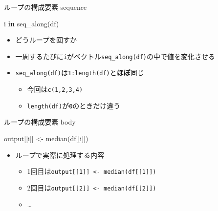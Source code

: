 \documentclass[
  ignorenonframetext,
  aspectratio=169]{beamer}
\newenvironment{Shaded}{\begin{snugshade}}{\end{snugshade}}
\newcommand{\ControlFlowTok}[1]{\textcolor[rgb]{0.13,0.29,0.53}{\textbf{#1}}}
\newcommand{\FunctionTok}[1]{\textcolor[rgb]{0.00,0.00,0.00}{#1}}
\newcommand{\NormalTok}[1]{#1}
\newcommand{\OtherTok}[1]{\textcolor[rgb]{0.56,0.35,0.01}{#1}}
\providecommand{\tightlist}{%
  \setlength{\itemsep}{0pt}\setlength{\parskip}{0pt}}
\begin{document}
\begin{frame}[fragile]{ループの構成要素 sequence}
\protect\hypertarget{ux30ebux30fcux30d7ux306eux69cbux6210ux8981ux7d20-sequence}{}
\begin{Shaded}
\begin{Highlighting}[]
\NormalTok{i }\ControlFlowTok{in} \FunctionTok{seq\_along}\NormalTok{(df)}
\end{Highlighting}
\end{Shaded}

\begin{itemize}
\tightlist
\item
  どうループを回すか
\item
  一周するたびに\texttt{i}がベクトル\texttt{seq\_along(df)}の中で値を変化させる
\item
  \texttt{seq\_along(df)}は\texttt{1:length(df)}と\textbf{ほぼ}同じ

  \begin{itemize}
  \tightlist
  \item
    今回は\texttt{c(1,2,3,4)}
  \item
    \texttt{length(df)}が\texttt{0}のときだけ違う
  \end{itemize}
\end{itemize}
\end{frame}

\begin{frame}[fragile]{ループの構成要素 body}
\protect\hypertarget{ux30ebux30fcux30d7ux306eux69cbux6210ux8981ux7d20-body}{}
\begin{Shaded}
\begin{Highlighting}[]
\NormalTok{output[[i]] }\OtherTok{\textless{}{-}} \FunctionTok{median}\NormalTok{(df[[i]])}
\end{Highlighting}
\end{Shaded}

\begin{itemize}
\tightlist
\item
  ループで実際に処理する内容

  \begin{itemize}
  \tightlist
  \item
    1回目は\texttt{output{[}{[}1{]}{]}\ \textless{}-\ median(df{[}{[}1{]}{]})}
  \item
    2回目は\texttt{output{[}{[}2{]}{]}\ \textless{}-\ median(df{[}{[}2{]}{]})}
  \item
    \ldots{}
  \end{itemize}
\end{itemize}
\end{frame}
\end{document}
